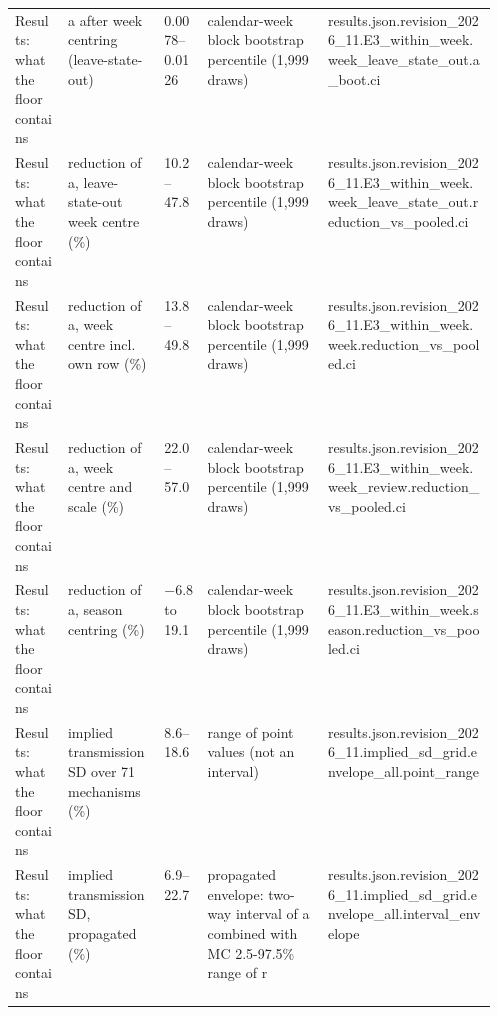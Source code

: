 \begin{table}[!tbp]
\begin{tabularx}{\linewidth}{@{}p{0.11\linewidth}p{0.2\linewidth}lp{0.25\linewidth}X@{}}
Results: what the floor contains & a after week centring (leave-state-out) & 0.0078--0.0126 & calendar-week block bootstrap percentile (1,999 draws) & {\ttfamily\tiny results.\allowbreak{}json.\allowbreak{}revision\_2026\_11.\allowbreak{}E3\_within\_week.\allowbreak{}week\_leave\_state\_out.\allowbreak{}a\_boot.\allowbreak{}ci} \\
Results: what the floor contains & reduction of a, leave-state-out week centre (\%) & 10.2--47.8 & calendar-week block bootstrap percentile (1,999 draws) & {\ttfamily\tiny results.\allowbreak{}json.\allowbreak{}revision\_2026\_11.\allowbreak{}E3\_within\_week.\allowbreak{}week\_leave\_state\_out.\allowbreak{}reduction\_vs\_pooled.\allowbreak{}ci} \\
Results: what the floor contains & reduction of a, week centre incl. own row (\%) & 13.8--49.8 & calendar-week block bootstrap percentile (1,999 draws) & {\ttfamily\tiny results.\allowbreak{}json.\allowbreak{}revision\_2026\_11.\allowbreak{}E3\_within\_week.\allowbreak{}week.\allowbreak{}reduction\_vs\_pooled.\allowbreak{}ci} \\
Results: what the floor contains & reduction of a, week centre and scale (\%) & 22.0--57.0 & calendar-week block bootstrap percentile (1,999 draws) & {\ttfamily\tiny results.\allowbreak{}json.\allowbreak{}revision\_2026\_11.\allowbreak{}E3\_within\_week.\allowbreak{}week\_review.\allowbreak{}reduction\_vs\_pooled.\allowbreak{}ci} \\
Results: what the floor contains & reduction of a, season centring (\%) & $-$6.8 to 19.1 & calendar-week block bootstrap percentile (1,999 draws) & {\ttfamily\tiny results.\allowbreak{}json.\allowbreak{}revision\_2026\_11.\allowbreak{}E3\_within\_week.\allowbreak{}season.\allowbreak{}reduction\_vs\_pooled.\allowbreak{}ci} \\
Results: what the floor contains & implied transmission SD over 71 mechanisms (\%) & 8.6--18.6 & range of point values (not an interval) & {\ttfamily\tiny results.\allowbreak{}json.\allowbreak{}revision\_2026\_11.\allowbreak{}implied\_sd\_grid.\allowbreak{}envelope\_all.\allowbreak{}point\_range} \\
Results: what the floor contains & implied transmission SD, propagated (\%) & 6.9--22.7 & propagated envelope: two-way interval of a combined with MC 2.5-97.5\% range of r & {\ttfamily\tiny results.\allowbreak{}json.\allowbreak{}revision\_2026\_11.\allowbreak{}implied\_sd\_grid.\allowbreak{}envelope\_all.\allowbreak{}interval\_envelope} \\

\end{tabularx}
\end{table}
